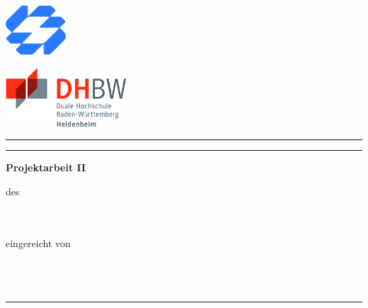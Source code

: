 \begin{titlepage}
	\noindent
	\begin{minipage}{0.45\textwidth}
		\includegraphics[width=2.25cm]{deckblatt/logos/company_logo.png}
	\end{minipage}
	\hfill
	\begin{minipage}{0.45\textwidth}
		\raggedleft
		\includegraphics[width=4.5cm]{deckblatt/logos/dhbw_logo.png}
	\end{minipage}

	\centering
	\vspace*{1.5cm}

	\begin{center}
		\rule{\textwidth}{0.6pt}
	\end{center}

	{\large\bfseries \projecttitle \par}

	\begin{center}
		\rule{\textwidth}{0.6pt}
	\end{center}

	{\large\bfseries Projektarbeit II\par}

	\vspace{0.5cm}
	{\normalsize des \degreeprogram\\
		\faculty\\
		\university\\
		\universitycity\par}

	\vspace{0.5cm}
	{\normalsize eingereicht von\\[0.1cm]
		\textbf{\studentname} \\
		\textbf{\studentaddress} \\
		\textbf{\studentcity} \\
	}

	\begin{center}
		\rule{\textwidth}{0.6pt}
	\end{center}


\end{titlepage}
